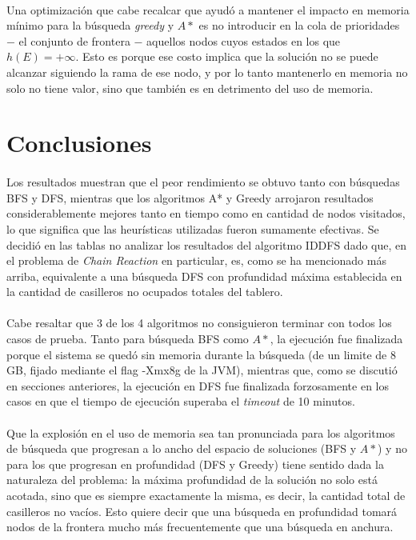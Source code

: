 \documentclass[12pt, twocolumn]{article}
\begin{document}
\paragraph{} Una optimización que cabe recalcar que ayudó a mantener el impacto en memoria mínimo para
la búsqueda \textit{greedy} y $A*$ es no introducir en la cola de prioridades $-$ el conjunto de frontera $-$ aquellos nodos cuyos estados en los que $h(E)=+\infty$. Esto es porque ese costo implica que la solución no se puede alcanzar siguiendo la rama de ese nodo, y por lo tanto mantenerlo en memoria no solo no tiene valor, sino que también es en detrimento del uso de memoria.

\section{Conclusiones}

\paragraph{} Los resultados muestran que el peor rendimiento se obtuvo tanto con búsquedas BFS y DFS, 
mientras que los algoritmos A* y Greedy arrojaron resultados considerablemente mejores tanto en tiempo 
como en cantidad de nodos visitados, lo que significa 
que las heurísticas utilizadas fueron sumamente efectivas. Se decidió en las tablas no analizar
los resultados del algoritmo IDDFS dado que, en el problema de \textit{Chain Reaction} en particular, es, como se ha mencionado más arriba, equivalente a una búsqueda DFS con profundidad máxima establecida en la cantidad de casilleros no ocupados totales del tablero. 

\paragraph{} Cabe resaltar que 3 de los 4 algoritmos no consiguieron terminar con todos los casos de prueba.
Tanto para búsqueda BFS como $A*$, la ejecución fue finalizada porque el sistema se quedó sin 
memoria durante la búsqueda (de un limite de 8 GB, fijado mediante el flag -Xmx8g de la JVM), mientras que, como se discutió en secciones anteriores, la ejecución en DFS fue finalizada forzosamente en los casos en que el tiempo de ejecución superaba el \textit{timeout} de 10 minutos.

\paragraph{} Que la explosión en el uso de memoria sea tan pronunciada para los algoritmos de búsqueda que 
progresan a lo ancho del espacio de soluciones (BFS y $A*$) y no para los que progresan en profundidad
(DFS y Greedy) tiene sentido dada la naturaleza del problema: la máxima profundidad de la solución
no solo está acotada, sino que es siempre exactamente la misma, es decir, la cantidad total de casilleros no vacíos. Esto quiere decir que una búsqueda en profundidad tomará nodos de la frontera mucho más frecuentemente que una búsqueda en anchura.

	
	
\end{document}

